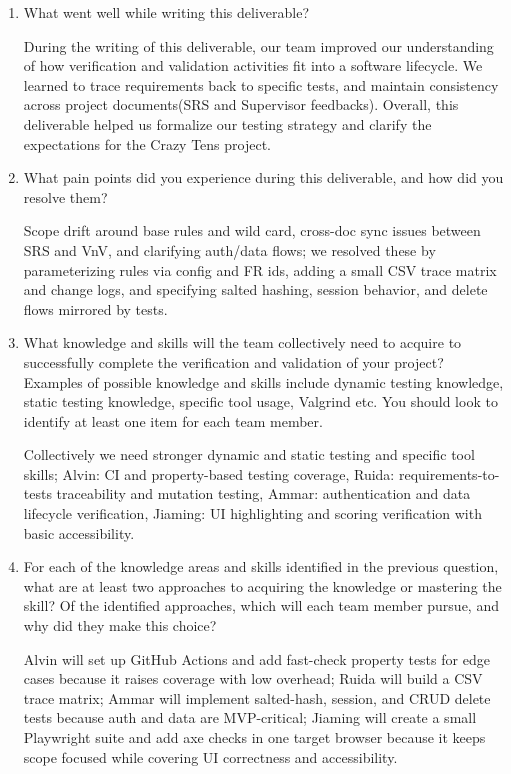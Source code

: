 \documentclass[12pt, titlepage]{article}
\begin{document}
\begin{enumerate}
  \item What went well while writing this deliverable? 

During the writing of this deliverable, our team improved our understanding of how verification and validation activities fit into a software lifecycle.  We learned to trace requirements back to specific tests, and maintain consistency across project documents(SRS and Supervisor feedbacks). Overall, this deliverable helped us formalize our testing strategy and clarify the expectations for the Crazy Tens project.
  \item What pain points did you experience during this deliverable, and how
    did you resolve them?


Scope drift around base rules and wild card, cross-doc sync issues between SRS and VnV, and clarifying auth/data flows; we resolved these by parameterizing rules via config and FR ids, adding a small CSV trace matrix and change logs, and specifying salted hashing, session behavior, and delete flows mirrored by tests.
  \item What knowledge and skills will the team collectively need to acquire to
  successfully complete the verification and validation of your project?
  Examples of possible knowledge and skills include dynamic testing knowledge,
  static testing knowledge, specific tool usage, Valgrind etc.  You should look to
  identify at least one item for each team member.

Collectively we need stronger dynamic and static testing and specific tool skills; Alvin: CI and property-based testing coverage, Ruida: requirements-to-tests traceability and mutation testing, Ammar: authentication and data lifecycle verification, Jiaming: UI highlighting and scoring verification with basic accessibility.
  \item For each of the knowledge areas and skills identified in the previous
  question, what are at least two approaches to acquiring the knowledge or
  mastering the skill?  Of the identified approaches, which will each team
  member pursue, and why did they make this choice?

Alvin will set up GitHub Actions and add fast-check property tests for edge cases because it raises coverage with low overhead; Ruida will build a CSV trace matrix; Ammar will implement salted-hash, session, and CRUD delete tests because auth and data are MVP-critical; Jiaming will create a small Playwright suite and add axe checks in one target browser because it keeps scope focused while covering UI correctness and accessibility.
\end{enumerate}
\end{document}
